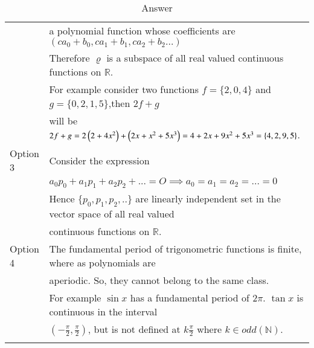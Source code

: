 \documentclass[journal,12pt]{IEEEtran}
\begin{document}
\begin{longtable}{|l|l|}
    & a polynomial function whose coefficients are $(ca_0+b_0,ca_1+b_1,ca_2+b_2...)$\\
    &Therefore $\varrho$ is a subspace of all real valued continuous functions on $\mathbb{R}$.\\
    & For example consider two functions $f=\{2,0,4\}$ and $g=\{0,2,1,5\}$,then $2f+g$ \\
    & will be $2f+g=2\left(2+4x^2\right)+\left(2x+x^2+5x^3\right)=4+2x+9x^2+5x^3=\{4,2,9,5\}$.\\
    \hline
    Option 3&Consider the expression\\
    &$a_0p_0+a_1p_1+a_2p_2+...=O\implies a_0=a_1=a_2=...=0$\\
    &Hence $\{p_0,p_1,p_2,..\}$ are linearly independent set in the vector space of all real valued \\
    &continuous functions on $\mathbb{R}$.\\
    \hline
    Option 4&The fundamental period of trigonometric functions is finite, where as polynomials are \\
    &aperiodic. So, they cannot belong to the same class.\\
    &For example $\sin{x}$ has a fundamental period of $2\pi$. $\tan{x}$ is continuous in the interval \\
    &$(-\frac{\pi}{2},\frac{\pi}{2})$, but is not defined at $k\frac{\pi}{2}$ where $k\in odd(\mathbb{N})$.\\
    \hline
    \caption{Answer}
    \label{tab:Ans}
\end{longtable}
\end{document}
